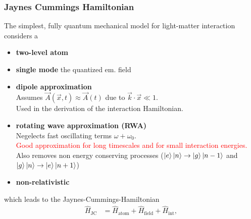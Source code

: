 \documentclass{article}
\begin{document}
\subsubsection*{Jaynes Cummings Hamiltonian}
The simplest, fully quantum mechanical model for light-matter interaction considers a
	\begin{itemize}
		\item \textbf{two-level atom}
		
		\item \textbf{single mode} the quantized em. field
		
		\item \textbf{dipole approximation}\\
		Assumes $\vec{A}(\vec{x},t) \approx \vec{A}(t)$ due to $\vec{k} \cdot \vec{x} \ll 1$.\\
		Used in the derivation of the interaction Hamiltonian.
		
		\item \textbf{rotating wave approximation (RWA)}\\
		Negelects fast oscillating terms $\omega+\omega_0$.\\
		\textcolor{red}{Good approximation for long timescales and for small interaction energies.}\\
		Also removes non energy conserving processes ($\ket{e}\ket{n} \to \ket{g}\ket{n-1}$ and $\ket{g}\ket{n} \to \ket{e}\ket{n+1}$)


		\item \textbf{non-relativistic}
	\end{itemize}

which leads to the Jaynes-Cummings-Hamiltonian
	\begin{align}
		\hat{H}_\text{JC} &= \hat{H}_\text{atom} + \hat{H}_\text{field} + \hat{H}_\text{int},
	\end{align}
\end{document}
